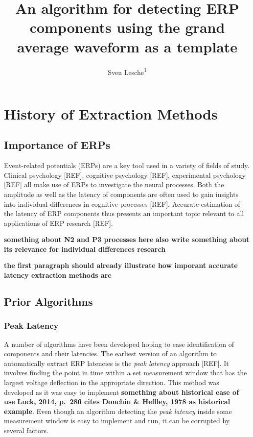 \documentclass[
  man,floatsintext]{apa7}
\title{An algorithm for detecting ERP components using the grand average waveform as a template}
\author{Sven Lesche\textsuperscript{1}}
\date{}
\affiliation{\vspace{0.5cm}\textsuperscript{1} Ruprecht-Karls-University Heidelberg}
\begin{document}
\maketitle

\hypertarget{history-of-extraction-methods}{%
\section{History of Extraction Methods}\label{history-of-extraction-methods}}

\hypertarget{importance-of-erps}{%
\subsection{Importance of ERPs}\label{importance-of-erps}}

Event-related potentials (ERPs) are a key tool used in a variety of fields of study. Clinical psychology {[}REF{]}, cognitive psychology {[}REF{]}, experimental psychology {[}REF{]} all make use of ERPs to investigate the neural processes. Both the amplitude as well as the latency of components are often used to gain insights into individual differences in cognitive processes {[}REF{]}. Accurate estimation of the latency of ERP components thus presents an important topic relevant to all applications of ERP research {[}REF{]}.

\textbf{something about N2 and P3 processes here} \textbf{also write something about its relevance for individual differences research}

\textbf{the first paragraph should already illustrate how imporant accurate latency extraction methods are}

\hypertarget{prior-algorithms}{%
\subsection{Prior Algorithms}\label{prior-algorithms}}

\hypertarget{peak-latency}{%
\subsubsection{Peak Latency}\label{peak-latency}}

A number of algorithms have been developed hoping to ease identification of components and their latencies. The earliest version of an algorithm to automatically extract ERP latencies is the \emph{peak latency} approach {[}REF{]}. It involves finding the point in time within a set measurement window that has the largest voltage deflection in the appropriate direction. This method was developed as it was easy to implement \textbf{something about historical ease of use} \textbf{Luck, 2014, p.~286 cites Donchin \& Heffley, 1978 as historical example}. Even though an algorithm detecting the \emph{peak latency} inside some measurement window is easy to implement and run, it can be corrupted by several factors.
\end{document}

